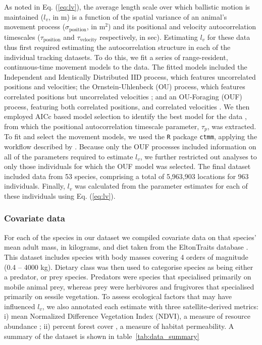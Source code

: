 \documentclass[12pt]{article}
\begin{document}
As noted in Eq. (\ref{eq:lv}), the average length scale over which ballistic motion is maintained ($l_v$, in m) is a function of the spatial variance of an animal's movement process ($\sigma_{\mathrm{position}}$, in m$^2$) and its positional and velocity autocorrelation timescales ($\tau_{\mathrm{position}}$ and $\tau_\mathrm{velocity}$ respectively, in sec). Estimating $l_v$ for these data thus first required estimating the autocorrelation structure in each of the individual tracking datasets. To do this, we fit a series of range-resident, continuous-time movement models to the data. The fitted models included the Independent and Identically Distributed IID process, which features uncorrelated positions and velocities; the Ornstein-Uhlenbeck (OU) process, which features correlated positions but uncorrelated velocities \cite{Uhlenbeck:1930fw}; and an OU-Foraging (OUF) process, featuring both correlated positions, and correlated velocities \cite{Fleming:2014jr, Fleming:2014gd}. We then employed AICc based model selection to identify the best model for the data \cite{Fleming:2014gd, Fleming:2015fo}, from which the positional autocorrelation timescale parameter, $\tau_p$, was extracted. To fit and select the movement models, we used the \texttt{R} package \texttt{ctmm}, applying the workflow described by \cite{Calabrese:2016ey}. Because only the OUF processes included information on all of the parameters required to estimate $l_v$, we further restricted out analyses to only those individuals for which the OUF model was selected. The final dataset included data from 53 species, comprising a total of 5,963,903 locations for 963 individuals. Finally, $l_v$ was calculated from the parameter estimates for each of these individuals using Eq. (\ref{eq:lv}).

\subsubsection*{Covariate data}

For each of the species in our dataset we compiled covariate data on that species' mean adult mass, in kilograms, and diet taken from the EltonTraits database \cite{Wilman:2014}. This dataset includes species with body masses covering 4 orders of magnitude (0.4 -- 4000 kg). Dietary class was then used to categorise species as being either a predator, or prey species. Predators were species that specialised primarily on mobile animal prey, whereas prey were herbivores and frugivores that specialised primarily on sessile vegetation. To assess ecological factors that may have influenced $l_v$, we also annotated each estimate with three satellite-derived metrics: i) mean Normalized Difference Vegetation Index (NDVI), a measure of resource abundance \cite{Pettorelli:2011}; ii) percent forest cover \cite{Tuanmu:2014}, a measure of habitat permeability. A summary of the dataset is shown in table~\ref{tab:data_summary} %
\end{document}
